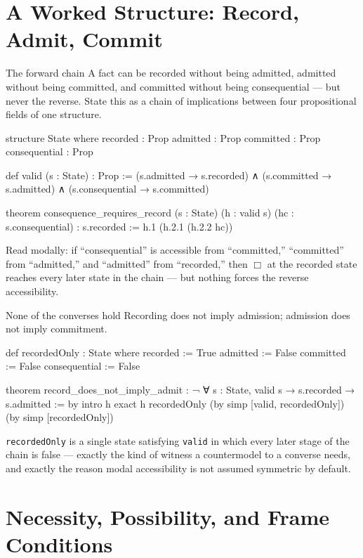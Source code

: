 \section{A Worked Structure: Record, Admit, Commit}

\begin{experiment}{The forward chain}
A fact can be recorded without being admitted, admitted without
being committed, and committed without being consequential — but
never the reverse. State this as a chain of implications between
four propositional fields of one structure.
\begin{lean}
structure State where
  recorded : Prop
  admitted : Prop
  committed : Prop
  consequential : Prop

def valid (s : State) : Prop :=
  (s.admitted → s.recorded) ∧
  (s.committed → s.admitted) ∧
  (s.consequential → s.committed)

theorem consequence_requires_record
    (s : State) (h : valid s) (hc : s.consequential) :
    s.recorded :=
  h.1 (h.2.1 (h.2.2 hc))
\end{lean}
Read modally: if ``consequential'' is accessible from
``committed,'' ``committed'' from ``admitted,'' and ``admitted''
from ``recorded,'' then $\Box$ at the recorded state reaches every
later state in the chain — but nothing forces the reverse
accessibility.
\end{experiment}

\begin{countermodel}{None of the converses hold}
Recording does not imply admission; admission does not imply
commitment.
\begin{lean}
def recordedOnly : State where
  recorded := True
  admitted := False
  committed := False
  consequential := False

theorem record_does_not_imply_admit :
    ¬ ∀ s : State, valid s → s.recorded → s.admitted := by
  intro h
  exact h recordedOnly (by simp [valid, recordedOnly]) (by simp [recordedOnly])
\end{lean}
\texttt{recordedOnly} is a single state satisfying \texttt{valid}
in which every later stage of the chain is false — exactly the kind
of witness a countermodel to a converse needs, and exactly the
reason modal accessibility is not assumed symmetric by default.
\end{countermodel}

\section{Necessity, Possibility, and Frame Conditions}

